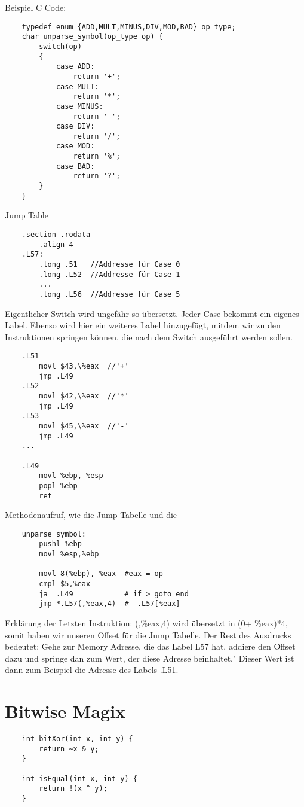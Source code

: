 \documentclass[a4paper, 11pt]{article}
\begin{document}
Beispiel C Code:
\begin{lstlisting}
	typedef enum {ADD,MULT,MINUS,DIV,MOD,BAD} op_type;
	char unparse_symbol(op_type op) {
		switch(op)
		{
			case ADD:
				return '+';
			case MULT:
				return '*';
			case MINUS:
				return '-';
			case DIV:
				return '/';
			case MOD:
				return '%';
			case BAD:
				return '?';
		}
	}
\end{lstlisting}

Jump Table
\begin{lstlisting}
	.section .rodata
		.align 4
	.L57:
		.long .51	//Addresse für Case 0
		.long .L52	//Addresse für Case 1
		...
		.long .L56  //Addresse für Case 5
\end{lstlisting}

Eigentlicher Switch wird ungefähr so übersetzt. Jeder Case bekommt ein eigenes Label. Ebenso wird hier ein weiteres Label hinzugefügt, mitdem wir zu den Instruktionen springen können, die nach dem Switch ausgeführt werden sollen.
\begin{lstlisting}
	.L51
		movl $43,\%eax  //'+'
		jmp .L49
	.L52
		movl $42,\%eax  //'*'
		jmp .L49
	.L53
		movl $45,\%eax  //'-'
		jmp .L49
	...
	
	.L49
		movl %ebp, %esp
		popl %ebp
		ret
\end{lstlisting}

Methodenaufruf, wie die Jump Tabelle und die
\begin{lstlisting}
	unparse_symbol:
		pushl %ebp
		movl %esp,%ebp
		
		movl 8(%ebp), %eax  #eax = op
		cmpl $5,%eax 		
		ja	.L49			# if > goto end
		jmp *.L57(,%eax,4)	#  .L57[%eax]
\end{lstlisting}
Erklärung der Letzten Instruktion:
(,\%eax,4) wird übersetzt in (0+ \%eax)*4, somit haben wir unseren Offset für die Jump Tabelle. Der Rest des Ausdrucks bedeutet: \"Gehe zur Memory Adresse, die das Label L57 hat, addiere den Offset dazu und springe dan zum Wert, der diese Adresse beinhaltet." Dieser Wert ist dann zum Beispiel die Adresse des Labels .L51.

\section{Bitwise Magix}
\begin{lstlisting}
	int bitXor(int x, int y) {
		return ~x & y;
	}
	
	int isEqual(int x, int y) {
		return !(x ^ y);
	}
\end{lstlisting}
\end{document}
